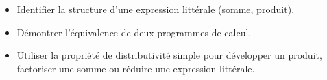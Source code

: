 \begin{changemargin}{-5mm}{-10mm}
\begin{prerequis}[Objectifs de 4\up{e}]    
    \begin{itemize}        
        \item Identifier la structure d’une expression littérale (somme, produit).
        \item Démontrer l’équivalence de deux programmes de calcul.
        \item Utiliser la propriété de distributivité simple pour développer un produit, factoriser une somme
        ou réduire une expression littérale.
    \end{itemize}
\end{prerequis}
\end{changemargin}